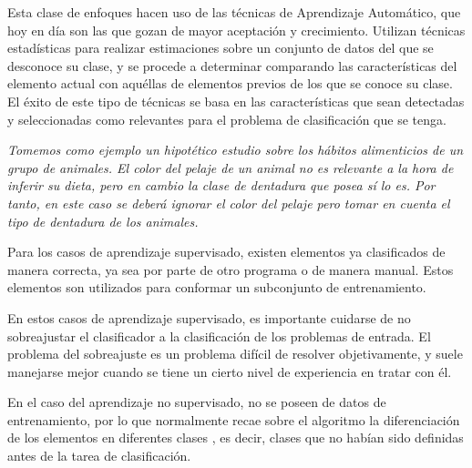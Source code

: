 Esta clase de enfoques hacen uso de las técnicas de Aprendizaje Automático, que hoy en día son las que gozan de mayor aceptación y crecimiento.
%
Utilizan técnicas estadísticas para realizar estimaciones sobre un conjunto de datos del que se desconoce su clase, y se procede a determinar comparando las características del elemento actual con aquéllas de elementos previos de los que se conoce su clase.
%
El éxito de este tipo de técnicas se basa en las características que sean detectadas y seleccionadas como relevantes para el problema de clasificación que se tenga.

\begin{minipage}{\linewidth}
\textit{Tomemos como ejemplo un hipotético estudio sobre los hábitos alimenticios de un grupo de animales.
El color del pelaje de un animal no es relevante a la hora de inferir su dieta, pero en cambio la clase de dentadura que posea sí lo es. Por tanto, en este caso se deberá ignorar el color del pelaje pero tomar en cuenta el tipo de dentadura de los animales.}
\end{minipage}


Para los casos de aprendizaje supervisado, existen elementos ya clasificados de manera correcta, ya sea por parte de otro programa o de manera manual. Estos elementos son utilizados para conformar un subconjunto de entrenamiento.

En estos casos de aprendizaje supervisado, es importante cuidarse de no sobreajustar el clasificador a la clasificación de los problemas de entrada. 
%
El problema del sobreajuste es un problema difícil de resolver objetivamente, y suele manejarse mejor cuando se tiene un cierto nivel de experiencia en tratar con él.

En el caso del aprendizaje no supervisado, no se poseen de datos de entrenamiento, por lo que normalmente recae sobre el algoritmo la diferenciación de los elementos en diferentes clases , es decir, clases que no habían sido definidas antes de la tarea de clasificación.



